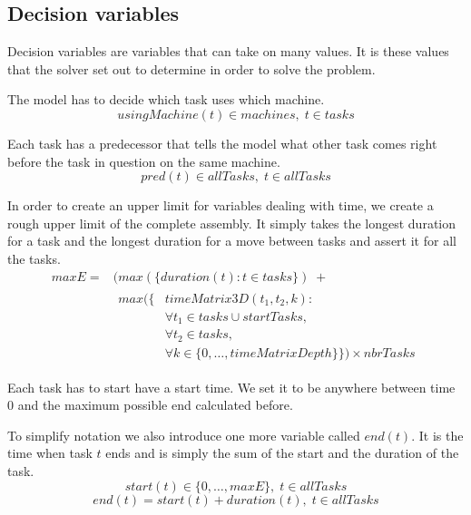  
 \subsection{Decision variables}
 Decision variables are variables that can take on many values. It is these values that the solver set out to determine in order to solve the problem.

  \noindent The model has to decide which task uses which machine.
 \begin{equation}\label{eq:40}
 usingMachine(t) \in machines, \; t \in tasks
 \end{equation}

  \noindent Each task has a predecessor that tells the model what other task comes right before the task in question on the same machine.
 \begin{equation}\label{eq:41}
 pred(t) \in allTasks, \; t \in allTasks
 \end{equation}

  \noindent In order to create an upper limit for variables dealing with time, we create a rough upper limit of the complete assembly. It simply takes the longest duration for a task and the longest duration for a move between tasks and assert it for all the tasks.
 \begin{equation}
 \begin{aligned}\label{eq:maxE}
 maxE = &(max(\{duration(t) : t \in tasks\}) \; +  \\ 
 &\begin{aligned}
 max(\{&timeMatrix3D(t_1,t_2,k) : \\
 &\forall t_1 \in tasks \cup startTasks,  \\ 
 &\forall t_2 \in tasks,\\
 &\forall k \in \{0 , \ldots , timeMatrixDepth\}\}) \times nbrTasks
  \end{aligned}
 \end{aligned}
 \end{equation}

  \noindent Each task has to start have a start time. We set it to be anywhere between time $0$ and the maximum possible end calculated before.
 
 To simplify notation we also introduce one more variable called $end(t)$. It is the time when task $t$ ends and is simply the sum of the start and the duration of the task.
 \begin{equation}\label{eq:46}
 start(t) \in \{0 , \ldots , maxE\}, \; t \in allTasks
 \end{equation} 
 \begin{equation}\label{eq:47}
 end(t) = start(t) + duration(t), \; t \in allTasks
 \end{equation}

